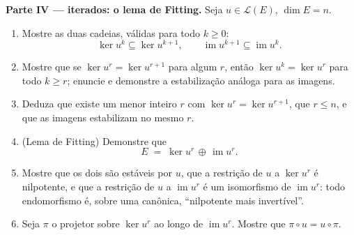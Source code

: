 \begin{problem}
\medskip
\noindent\textbf{Parte IV ---  iterados: o lema de
Fitting.} Seja $u \in \mathcal{L}(E)$, $\dim E = n$.
\begin{enumerate}[resume]
  \item Mostre as duas cadeias, válidas para todo $k \geq 0$:
        \[
        \ker u^k \subseteq \ker u^{k+1},
        \qquad
        \operatorname{im} u^{k+1} \subseteq \operatorname{im}
        u^k .
        \]
  \item Mostre que se $\ker u^{r} = \ker u^{r+1}$ para algum $r$, então $\ker u^{k} = \ker u^{r}$ para todo
        $k \geq r$; enuncie e demonstre a estabilização análoga para as
        imagens.
  \item Deduza que existe um menor inteiro $r$ com $\ker
        u^{r} = \ker u^{r+1}$, que
        $r \leq n$, e que as imagens estabilizam no mesmo $r$.
  \item (Lema de Fitting) Demonstre que
        \[
        E \;=\; \ker u^{r} \,\oplus\, \operatorname{im} u^{r} .
        \]
  \item Mostre que os dois  são estáveis por $u$, que a
        restrição de $u$ a $\ker u^{r}$ é nilpotente, e que a restrição de
        $u$ a $\operatorname{im} u^{r}$ é um isomorfismo de $\operatorname{im} u^{r}$: todo endomorfismo é,
        sobre uma  canônica, ``nilpotente mais
        invertível''.
  \item Seja $\pi$ o projetor sobre $\ker u^{r}$ ao longo de $\operatorname{im} u^{r}$. Mostre
        que $\pi \circ u = u
        \circ \pi$.
\end{enumerate}


\end{problem}
